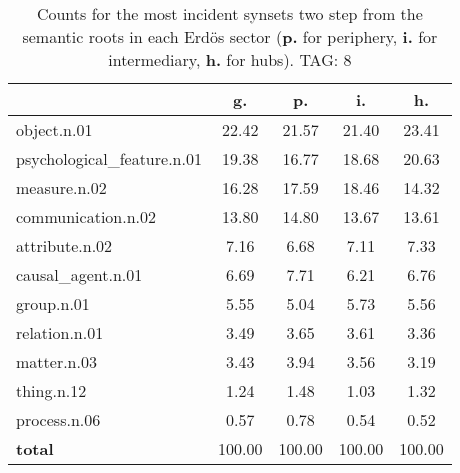 \begin{table}[h!]
\begin{center}
\begin{tabular}{| l | c | c | c | c |}\hline
 & g. & p. & i. & h. \\\hline
object.n.01 & 22.42  & 21.57  & 21.40  & 23.41 \\\hline
psychological\_feature.n.01 & 19.38  & 16.77  & 18.68  & 20.63 \\\hline
measure.n.02 & 16.28  & 17.59  & 18.46  & 14.32 \\\hline
communication.n.02 & 13.80  & 14.80  & 13.67  & 13.61 \\\hline
attribute.n.02 & 7.16  & 6.68  & 7.11  & 7.33 \\\hline
causal\_agent.n.01 & 6.69  & 7.71  & 6.21  & 6.76 \\\hline
group.n.01 & 5.55  & 5.04  & 5.73  & 5.56 \\\hline
relation.n.01 & 3.49  & 3.65  & 3.61  & 3.36 \\\hline
matter.n.03 & 3.43  & 3.94  & 3.56  & 3.19 \\\hline
thing.n.12 & 1.24  & 1.48  & 1.03  & 1.32 \\\hline
process.n.06 & 0.57  & 0.78  & 0.54  & 0.52 \\\hline
{{\bf total}} & 100.00  & 100.00  & 100.00  & 100.00 \\\hline
\end{tabular}
\caption{Counts for the most incident synsets two step from the semantic roots in each Erd\"os sector ({\bf p.} for periphery, {\bf i.} for intermediary, {\bf h.} for hubs). TAG: 8}
\end{center}
\end{table}